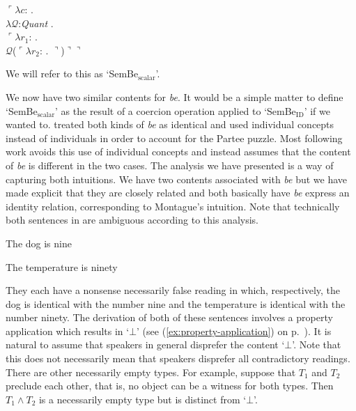 \begin{ex} 
  $\ulcorner\lambda c$: . \\
        \hspace*{1em}$\lambda\mathcal{Q}$:\textit{Quant} . \\
        \hspace*{2em} $\ulcorner\lambda r_1$:
. \\
\hspace*{3em} $\mathcal{Q}$($\ulcorner\lambda
r_2$:
. $\urcorner$)$\urcorner\urcorner$  
\end{ex} 
We will refer to this as `SemBe$_{\text{scalar}}$'.

We now have two similar contents for \textit{be}.  It would be a
simple matter to define `SemBe$_{\text{scalar}}$' as the result of a
coercion operation applied to `SemBe$_{\text{ID}}$' if we wanted to.
\cite{Montague1973} treated both kinds of \textit{be} as identical and
used individual concepts instead of individuals in order to account
for the Partee puzzle.  Most following work avoids this use of
individual concepts and instead assumes that the content of
\textit{be} is different in the two cases.  The analysis we have
presented is a way of capturing both intuitions.  We have two contents
associated with \textit{be} but we have made explicit that they are
closely related and both basically have \textit{be} express an
identity relation, corresponding to Montague's intuition.  Note that
technically both sentences in \nexteg{} are ambiguous according to
this analysis.
\begin{ex} 
\begin{subex} 
 
\item The dog is nine 
 
\item The temperature is ninety 
 
\end{subex} 
   
\end{ex} 
They each have a nonsense necessarily false reading in which,
respectively, the dog is identical with the number nine and the
temperature is identical with the number ninety.  The derivation of
both of these sentences involves a property application which results
in `$\bot$' (see (\ref{ex:property-application}) on
p.~\pageref{ex:property-application}).  It is natural to assume that
speakers in general disprefer the content `$\bot$'.  Note that this
does not necessarily mean that speakers disprefer all contradictory
readings.  There are other necessarily empty types.  For example,
suppose that $T_1$ and $T_2$ preclude each other, that is, no object
can be a witness for both types.  Then $T_1\wedge T_2$ is a
necessarily empty type but is distinct from `$\bot$'.

